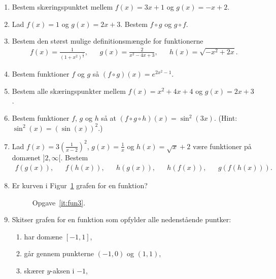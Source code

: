 \begin{enumerate}
	\item Bestem skæringspunktet mellem $f(x)=3x+1$ og $g(x)=-x+2$.	
	
		\item Lad $f(x)=1$ og $g(x)=2x+3$. Bestem $f\circ g$ og $g\circ f$.
	
		
	\item Bestem den størst mulige definitionsmængde for funktionerne
	\begin{align*}
	f(x)=\frac{1}{(1+x^2)^\frac{1}{2}},&& g(x)=\frac{2}{x^2-4x+3},&& h(x)=\sqrt{-x^2+2x}.
	\end{align*}
	


	\item Bestem funktioner $f$ og $g$ så $(f\circ g)(x)=e^{2x^2-1}$.
	
	\item Bestem alle skæringspunkter mellem $f(x)=x^2+4x+4$ og $g(x)=2x+3$.
	
	\item Bestem funktioner $f$, $g$ og $h$ så at $(f\circ g\circ h)(x)=\sin^2(3x)$. (Hint: $ \sin^2(x)=(\sin(x))^2 $.)
	
	\item Lad $f(x)=3(\frac{1}{x-2})^2$, $g(x)=\frac{1}{x}$ og $h(x)=\sqrt{x}+2$ være funktioner på domænet $]2,\infty[$. Bestem
	\begin{align*}
	f(g(x)),&& f(h(x)),&& h(g(x)),&& h(f(x)),&&g(f(h(x))).
	\end{align*} 
	
		\item\label{it:fun3} Er kurven i Figur~\ref{fig:fun3} grafen for en funktion?
	\begin{figure}
		\centering
		\caption{Opgave~\ref{it:fun3}.}
		\label{fig:fun3}
	\end{figure}
	
	
		
	\item Skitser grafen for en funktion som opfylder alle nedenstående puntker:
	\begin{enumerate}
		\item har domæne $[-1,1]$,
		\item går gennem punkterne $(-1,0)$ og $(1,1)$,
		\item skærer $y$-aksen i $-1$,
	\end{enumerate}
	
\end{enumerate}